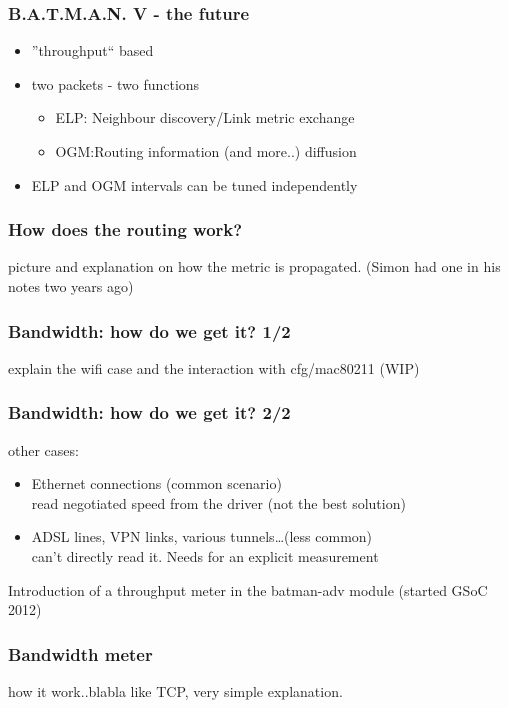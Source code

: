 \documentclass[slidestop]{beamer}
\begin{document}
\begin{frame}[c]
	\frametitle{B.A.T.M.A.N. V - the future}
	\begin{itemize}
		\item ''throughput`` based
		\item two packets - two functions
			\begin{itemize}
				\item ELP: Neighbour discovery/Link metric
					exchange
				\item OGM:Routing information (and more..) diffusion
			\end{itemize}
		\item ELP and OGM intervals can be tuned independently
	\end{itemize}
	\begin{figure}
		\centering
	\end{figure}
\end{frame}

\begin{frame}[c]
	\frametitle{How does the routing work?}
	picture and explanation on how the metric is propagated. (Simon had one
	in his notes two years ago)
\end{frame}

\begin{frame}[c]
	\frametitle{Bandwidth: how do we get it? 1/2}
	explain the wifi case and the interaction with cfg/mac80211 (WIP)
\end{frame}

\begin{frame}[c]
	\frametitle{Bandwidth: how do we get it? 2/2}
	other cases:
	\begin{itemize}
		\item Ethernet connections (common scenario)\\
			read negotiated speed from the driver (not the best
			solution)
		\pause
		\item ADSL lines, VPN links, various tunnels\dots (less
			common)\\
			can't directly read it. Needs for an explicit
			measurement
	\end{itemize}
	\pause
	Introduction of a throughput meter in the batman-adv module (started
	GSoC 2012)
\end{frame}

\begin{frame}[c]
	\frametitle{Bandwidth meter}
	how it work..blabla like TCP, very simple explanation.
\end{frame}
\end{document}

